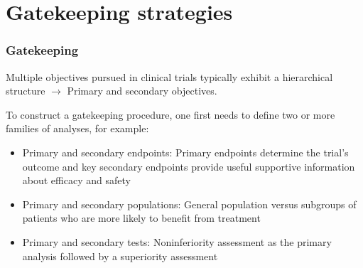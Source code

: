 \documentclass[xcolor={pdftex,dvipsnames,table}]{beamer}
\newcommand{\rbf}[1]{\textcolor{redUnipd}{ #1}}
\begin{document}
\begin{frame}
\begin{center}
\end{center}
\end{frame}

\section{Gatekeeping strategies}

\begin{frame}
\frametitle{Gatekeeping}
Multiple objectives pursued in clinical trials typically exhibit a hierarchical structure $\rightarrow$ Primary and secondary objectives.

\bigskip

To construct a gatekeeping procedure, one first needs to define two or
more families of analyses, for example:
\begin{itemize}
    \item \rbf{Primary and secondary endpoints}: Primary endpoints determine the trial's outcome and key secondary endpoints provide useful supportive information about efficacy and safety
    \item \rbf{Primary and secondary populations}: General population versus subgroups of patients who are more likely to benefit from treatment
    \item \rbf{Primary and secondary tests}: Noninferiority assessment as the primary analysis followed by a superiority assessment
\end{itemize}


\end{frame}
\end{document}

